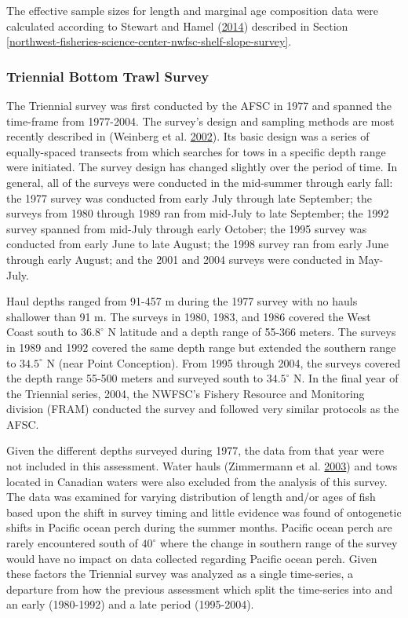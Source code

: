 \documentclass[12pt,]{article}
\begin{document}
The effective sample sizes for length and marginal age composition data
were calculated according to Stewart and Hamel
(\protect\hyperlink{ref-stewart_bootstrapping_2014}{2014}) described in
Section
\ref{northwest-fisheries-science-center-nwfsc-shelf-slope-survey}.

\subsubsection{Triennial Bottom Trawl
Survey}\label{triennial-bottom-trawl-survey}

The Triennial survey was first conducted by the AFSC in 1977 and spanned
the time-frame from 1977-2004. The survey's design and sampling methods
are most recently described in (Weinberg et al.
\protect\hyperlink{ref-weinberg_estimation_2002}{2002}). Its basic
design was a series of equally-spaced transects from which searches for
tows in a specific depth range were initiated. The survey design has
changed slightly over the period of time. In general, all of the surveys
were conducted in the mid-summer through early fall: the 1977 survey was
conducted from early July through late September; the surveys from 1980
through 1989 ran from mid-July to late September; the 1992 survey
spanned from mid-July through early October; the 1995 survey was
conducted from early June to late August; the 1998 survey ran from early
June through early August; and the 2001 and 2004 surveys were conducted
in May-July.

Haul depths ranged from 91-457 m during the 1977 survey with no hauls
shallower than 91 m. The surveys in 1980, 1983, and 1986 covered the
West Coast south to \(36.8^\circ\) N latitude and a depth range of
55-366 meters. The surveys in 1989 and 1992 covered the same depth range
but extended the southern range to \(34.5^\circ\) N (near Point
Conception). From 1995 through 2004, the surveys covered the depth range
55-500 meters and surveyed south to \(34.5^\circ\) N. In the final year
of the Triennial series, 2004, the NWFSC's Fishery Resource and
Monitoring division (FRAM) conducted the survey and followed very
similar protocols as the AFSC.

Given the different depths surveyed during 1977, the data from that year
were not included in this assessment. Water hauls (Zimmermann et al.
\protect\hyperlink{ref-zimmermann_influence_2003}{2003}) and tows
located in Canadian waters were also excluded from the analysis of this
survey. The data was examined for varying distribution of length and/or
ages of fish based upon the shift in survey timing and little evidence
was found of ontogenetic shifts in Pacific ocean perch during the summer
months. Pacific ocean perch are rarely encountered south of \(40^\circ\)
where the change in southern range of the survey would have no impact on
data collected regarding Pacific ocean perch. Given these factors the
Triennial survey was analyzed as a single time-series, a departure from
how the previous assessment which split the time-series into and an
early (1980-1992) and a late period (1995-2004).
\end{document}
